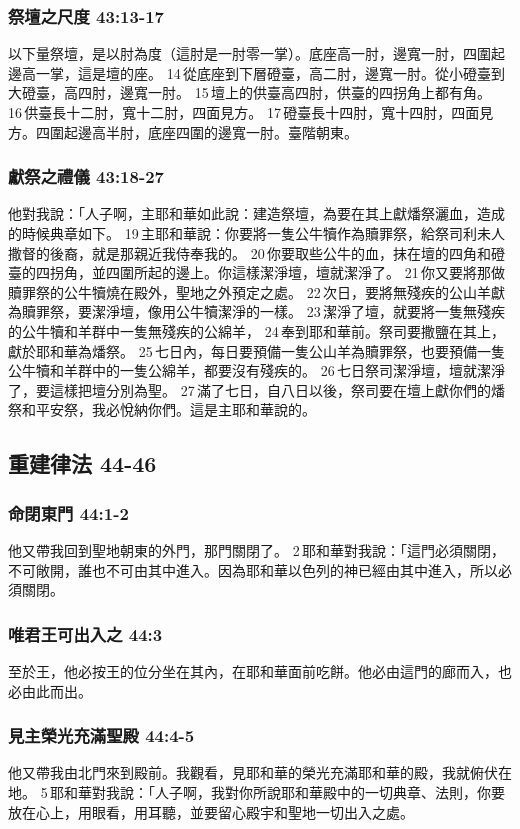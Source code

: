 \subsubsection{祭壇之尺度 43:13-17}
以下量祭壇，是以肘為度（這肘是一肘零一掌）。底座高一肘，邊寬一肘，四圍起邊高一掌，這是壇的座。 14 從底座到下層磴臺，高二肘，邊寬一肘。從小磴臺到大磴臺，高四肘，邊寬一肘。 15 壇上的供臺高四肘，供臺的四拐角上都有角。 16 供臺長十二肘，寬十二肘，四面見方。 17 磴臺長十四肘，寬十四肘，四面見方。四圍起邊高半肘，底座四圍的邊寬一肘。臺階朝東。

\subsubsection{獻祭之禮儀 43:18-27}
他對我說：「人子啊，主耶和華如此說：建造祭壇，為要在其上獻燔祭灑血，造成的時候典章如下。 19 主耶和華說：你要將一隻公牛犢作為贖罪祭，給祭司利未人撒督的後裔，就是那親近我侍奉我的。 20 你要取些公牛的血，抹在壇的四角和磴臺的四拐角，並四圍所起的邊上。你這樣潔淨壇，壇就潔淨了。 21 你又要將那做贖罪祭的公牛犢燒在殿外，聖地之外預定之處。 22 次日，要將無殘疾的公山羊獻為贖罪祭，要潔淨壇，像用公牛犢潔淨的一樣。 23 潔淨了壇，就要將一隻無殘疾的公牛犢和羊群中一隻無殘疾的公綿羊， 24 奉到耶和華前。祭司要撒鹽在其上，獻於耶和華為燔祭。 25 七日內，每日要預備一隻公山羊為贖罪祭，也要預備一隻公牛犢和羊群中的一隻公綿羊，都要沒有殘疾的。 26 七日祭司潔淨壇，壇就潔淨了，要這樣把壇分別為聖。 27 滿了七日，自八日以後，祭司要在壇上獻你們的燔祭和平安祭，我必悅納你們。這是主耶和華說的。

\subsection{重建律法 44-46}
\subsubsection{命閉東門 44:1-2}
他又帶我回到聖地朝東的外門，那門關閉了。 2 耶和華對我說：「這門必須關閉，不可敞開，誰也不可由其中進入。因為耶和華以色列的神已經由其中進入，所以必須關閉。

\subsubsection{唯君王可出入之 44:3}
至於王，他必按王的位分坐在其內，在耶和華面前吃餅。他必由這門的廊而入，也必由此而出。

\subsubsection{見主榮光充滿聖殿 44:4-5}
他又帶我由北門來到殿前。我觀看，見耶和華的榮光充滿耶和華的殿，我就俯伏在地。 5 耶和華對我說：「人子啊，我對你所說耶和華殿中的一切典章、法則，你要放在心上，用眼看，用耳聽，並要留心殿宇和聖地一切出入之處。

